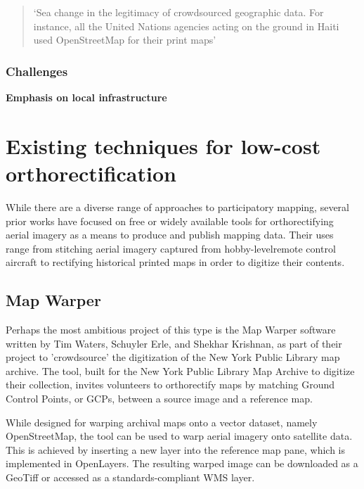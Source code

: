 \documentclass[11pt]{report}
\begin{document}
\begin{quote}`Sea change in the legitimacy of crowdsourced geographic data. For instance, all the United Nations agencies acting on the ground in Haiti used OpenStreetMap for their print maps'\end{quote} \cite{glennon2010grassrootscrisis}

\subsubsection{Challenges}
\textbf{Emphasis on local infrastructure}

\section{Existing techniques for low-cost orthorectification}

While there are a diverse range of approaches to participatory mapping, several prior works have focused on free or widely available tools for orthorectifying aerial imagery as a means to produce and publish mapping data. Their uses range from stitching aerial imagery captured from hobby-levelremote control aircraft to rectifying historical printed maps in order to digitize their contents.

\subsection{Map Warper}

Perhaps the most ambitious project of this type is the Map Warper software written by Tim Waters, Schuyler Erle, and Shekhar Krishnan, as part of their project to 'crowdsource' the digitization of the New York Public Library map archive. \cite{waters2009warper} The tool, built for the New York Public Library Map Archive to digitize their collection, invites volunteers to orthorectify maps by matching Ground Control Points, or GCPs, between a source image and a reference map. 

While designed for warping archival maps onto a vector dataset, namely OpenStreetMap, the tool can be used to warp aerial imagery onto satellite data. This is achieved by inserting a new layer into the reference map pane, which is implemented in OpenLayers. The resulting warped image can be downloaded as a GeoTiff or accessed as a standards-compliant WMS layer. 
\end{document}
